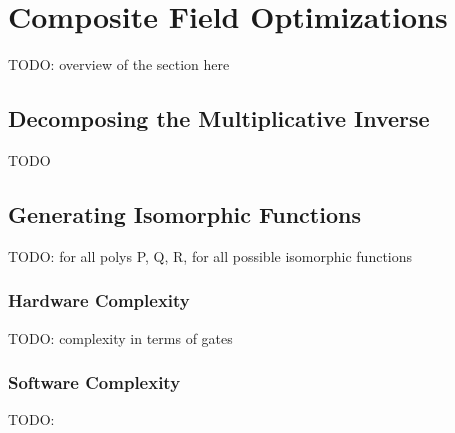 \section{Composite Field Optimizations}
TODO: overview of the section here

\subsection{Decomposing the Multiplicative Inverse}
TODO

\subsection{Generating Isomorphic Functions}
TODO: for all polys P, Q, R, for all possible isomorphic functions

\subsubsection{Hardware Complexity}
TODO: complexity in terms of gates

\subsubsection{Software Complexity}
TODO: 